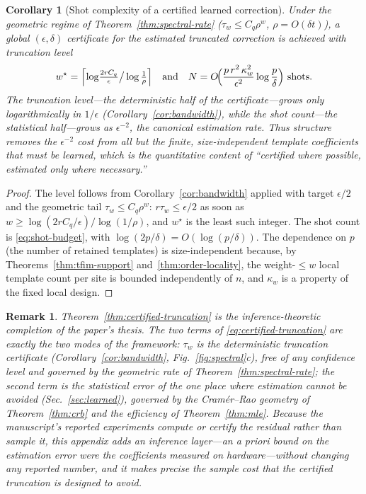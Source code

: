 \documentclass[aps,prresearch,reprint,superscriptaddress,nofootinbib,amsmath,amssymb]{revtex4-2}
\newcommand{\dt}{\delta t}
\newtheorem{corollary}{Corollary}
\newtheorem{remark}{Remark}
\begin{document}
\begin{corollary}[Shot complexity of a certified learned correction]
\label{cor:shot-complexity}
Under the geometric regime of Theorem~\ref{thm:spectral-rate} ($\tau_w\leq C_q\rho^w$, $\rho=O(\dt)$), a global $(\epsilon,\delta)$ certificate for the estimated truncated correction is achieved with truncation level
\begin{equation*}
    w^\star=\Bigl\lceil\log\!\tfrac{2rC_q}{\epsilon}\big/\log\tfrac1\rho\Bigr\rceil
    \quad\text{and}\quad
    N=O\!\Bigl(\frac{p\,r^2\,\kappa_w^2}{\epsilon^2}\log\frac p\delta\Bigr)\ \text{shots.}
\end{equation*}
The truncation level---the deterministic half of the certificate---grows only logarithmically in $1/\epsilon$ (Corollary~\ref{cor:bandwidth}), while the shot count---the statistical half---grows as $\epsilon^{-2}$, the canonical estimation rate. Thus structure removes the $\epsilon^{-2}$ cost from all but the finite, size-independent template coefficients that must be learned, which is the quantitative content of ``certified where possible, estimated only where necessary.''
\end{corollary}

\begin{proof}
The level follows from Corollary~\ref{cor:bandwidth} applied with target $\epsilon/2$ and the geometric tail $\tau_w\leq C_q\rho^w$: $r\tau_{w}\leq\epsilon/2$ as soon as $w\geq\log(2rC_q/\epsilon)/\log(1/\rho)$, and $w^\star$ is the least such integer. The shot count is \eqref{eq:shot-budget}, with $\log(2p/\delta)=O(\log(p/\delta))$. The dependence on $p$ (the number of retained templates) is size-independent because, by Theorems~\ref{thm:tfim-support} and~\ref{thm:order-locality}, the weight-$\leq w$ local template count per site is bounded independently of $n$, and $\kappa_w$ is a property of the fixed local design.
\end{proof}

\begin{remark}
Theorem~\ref{thm:certified-truncation} is the inference-theoretic completion of the paper's thesis. The two terms of \eqref{eq:certified-truncation} are exactly the two modes of the framework: $\tau_w$ is the \emph{deterministic} truncation certificate (Corollary~\ref{cor:bandwidth}, Fig.~\ref{fig:spectral}c), free of any confidence level and governed by the geometric rate of Theorem~\ref{thm:spectral-rate}; the second term is the \emph{statistical} error of the one place where estimation cannot be avoided (Sec.~\ref{sec:learned}), governed by the Cram\'er--Rao geometry of Theorem~\ref{thm:crb} and the efficiency of Theorem~\ref{thm:mle}. Because the manuscript's reported experiments compute or certify the residual rather than sample it, this appendix adds an inference layer---an a priori bound on the estimation error \emph{were} the coefficients measured on hardware---without changing any reported number, and it makes precise the sample cost that the certified truncation is designed to avoid.
\end{remark}
\end{document}

